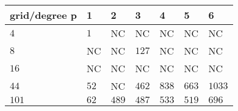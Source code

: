 \begin{tabular}{lllllll}
\hline
 grid/degree p   & 1    & 2     & 3     & 4     & 5     & 6      \\
\hline
 $4$             & $1$  & NC    & NC    & NC    & NC    & NC     \\
 $8$             & NC   & NC    & $127$ & NC    & NC    & NC     \\
 $16$            & NC   & NC    & NC    & NC    & NC    & NC     \\
 $44$            & $52$ & NC    & $462$ & $838$ & $663$ & $1033$ \\
 $101$           & $62$ & $489$ & $487$ & $533$ & $519$ & $696$  \\
\hline
\end{tabular}